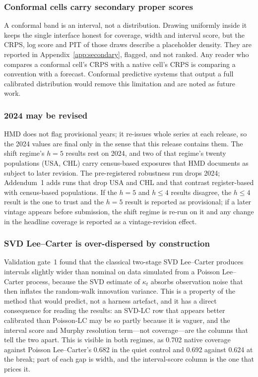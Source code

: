 \subsubsection{Conformal cells carry secondary proper scores}

A conformal band is an interval, not a distribution. Drawing uniformly
inside it keeps the single interface honest for coverage, width and
interval score, but the CRPS, log score and PIT of those draws describe a
placeholder density. They are reported in Appendix~\ref{app:secondary},
flagged, and not ranked. Any reader who compares a conformal cell's CRPS
with a native cell's CRPS is comparing a convention with a forecast.
Conformal predictive systems that output a full calibrated distribution
would remove this limitation and are noted as future work.

\subsubsection{2024 may be revised}

HMD does not flag provisional years; it re-issues whole series at each
release, so the 2024 values are final only in the sense that this release
contains them. The shift regime's $h=5$ results rest on 2024, and two of
that regime's twenty populations (USA, CHL) carry census-based exposures
that HMD documents as subject to later revision. The pre-registered robustness run
drops 2024; Addendum~1 adds runs that drop USA and CHL and that contrast
register-based with census-based populations. If the $h=5$ and $h\le4$
results disagree, the $h\le4$ result is the one to trust and the $h=5$
result is reported as provisional; if a later vintage appears before
submission, the shift regime is re-run on it and any change in the
headline coverage is reported as a vintage-revision effect.

\subsubsection{SVD Lee--Carter is over-dispersed by construction}

Validation gate~1 found that the classical two-stage SVD Lee--Carter
produces intervals slightly wider than nominal on data simulated from a
Poisson Lee--Carter process, because the SVD estimate of $\kappa_t$
absorbs observation noise that then inflates the random-walk innovation
variance. This is a property of the method that
\citet{girosi2007understanding} would predict, not a harness artefact,
and it has a direct consequence for reading the results: an SVD-LC row
that appears better calibrated than Poisson-LC may be so partly because
it is vaguer, and the interval score and Murphy resolution term---not
coverage---are the columns that tell the two apart. This is visible in
both regimes, as 0.702 native coverage against Poisson Lee--Carter's
0.682 in the quiet control and 0.692 against 0.624 at the break; part of
each gap is width, and the interval-score column is the one that prices
it.

